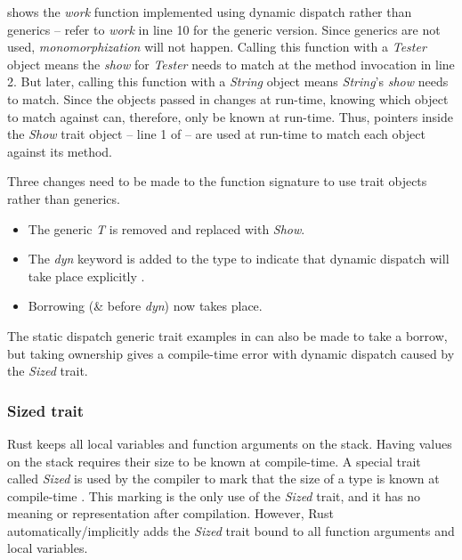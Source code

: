  shows the \textit{work} function implemented using dynamic dispatch rather than generics -- refer to \textit{work} in  line 10 for the generic version.
Since generics are not used, \textit{monomorphization} will not happen.
Calling this function with a \textit{Tester} object means the \textit{show} for \textit{Tester} needs to match at the method invocation in line 2.
But later, calling this function with a \textit{String} object means \textit{String}'s \textit{show} needs to match.
Since the objects passed in changes at run-time, knowing which object to match against can, therefore, only be known at run-time.
Thus, pointers inside the \textit{Show} trait object -- line 1 of  -- are used at run-time to match each object against its method.


Three changes need to be made to the function signature to use trait objects rather than generics.
\begin{itemize}
	\item The generic \textit{T} is removed and replaced with \textit{Show}.
	\item The \textit{dyn} keyword is added to the type to indicate that dynamic dispatch will take place explicitly \cite{klabnik_2019_01}.
	\item Borrowing (\& before \textit{dyn}) now takes place.
\end{itemize}

The static dispatch generic trait examples in  can also be made to take a borrow, but taking ownership gives a compile-time error with dynamic dispatch caused by the \textit{Sized} trait.

\subsubsection{Sized trait}
Rust keeps all local variables and function arguments on the stack.
Having values on the stack requires their size to be known at compile-time.
A special trait called \textit{Sized} is used by the compiler to mark that the size of a type is known at compile-time \cite{klabnik_2019_01}.
This marking is the only use of the \textit{Sized} trait, and it has no meaning or representation after compilation.
However, Rust automatically/implicitly adds the \textit{Sized} trait bound to all function arguments and local variables.


